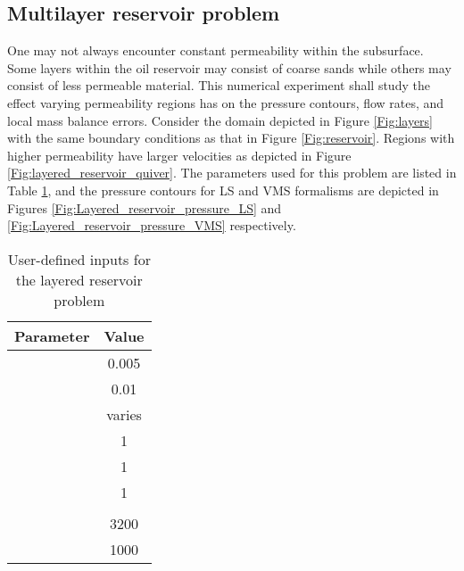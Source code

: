 \documentclass[11pt,reqno]{amsart}
\begin{document}
\subsection{Multilayer reservoir problem}
One may not always encounter constant permeability within the subsurface. Some layers 
within the oil reservoir may consist of coarse sands while others may consist of less permeable 
material. This numerical experiment shall study the effect varying permeability regions
has on the pressure contours, flow rates, and local mass balance errors. Consider the domain 
depicted in Figure \ref{Fig:layers} with the same boundary conditions
as that in Figure \ref{Fig:reservoir}. Regions with higher permeability have larger velocities as 
depicted in Figure \ref{Fig:layered_reservoir_quiver}. The parameters used for this problem are 
listed in Table \ref{Tab:layered_reservoir}, and the pressure contours for LS and VMS formalisms are depicted in Figures 
\ref{Fig:Layered_reservoir_pressure_LS} and \ref{Fig:Layered_reservoir_pressure_VMS} respectively.
\begin{table}[b!]
  \centering
  \caption{User-defined inputs for the layered reservoir problem}
  \begin{tabular}{cc}
    \hline
    Parameter & Value \\ \hline
     & 0.005\\
     & 0.01\\	
     & varies\\
     & 1\\
     & 1 \\
     & 1 \\
     & \\
     & 3200\\
     & 1000\\
    \hline
  \end{tabular}
  \label{Tab:layered_reservoir}
\end{table}
\end{document}
